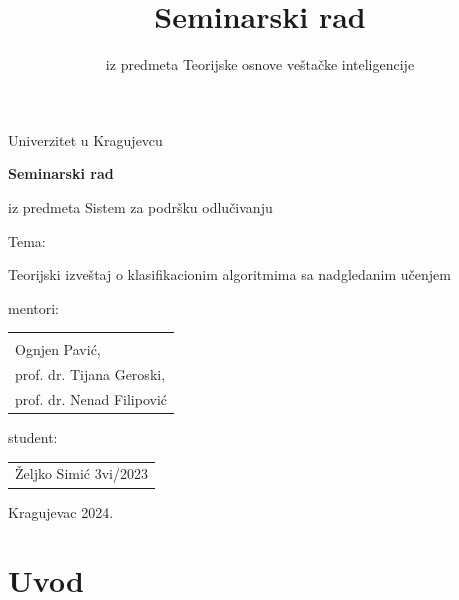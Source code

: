 \documentclass[fontsize=12bp, paper=a4]{scrarticle}
\title{Seminarski rad}
\subtitle{iz predmeta Teorijske osnove veštačke inteligencije}
\begin{document}
\begin{titlepage}
    
    \begin{center}
        
        \vspace*{8cm}
        
        \large{Univerzitet u Kragujevcu}
        
        \vspace*{1cm}

        {\bfseries \LARGE Seminarski rad}
        
        \large{iz predmeta Sistem za podršku odlučivanju}
        
        \vspace*{1cm}
        \large{Tema:}

        \Large{Teorijski izveštaj o klasifikacionim algoritmima sa nadgledanim učenjem}


        \vspace*{2cm}
    \end{center}
    \hfill{\parbox[s]{8cm}{

    mentori: 
    \begin{tabular}{l}
        \\
        \\
        Ognjen Pavić, \\
        prof. dr. Tijana Geroski, \\
        prof. dr. Nenad Filipović 
    \end{tabular}
    
    student: \begin{tabular}{l}
        Željko Simić 3vi/2023
    \end{tabular}
    }}

    \hspace*{\fill} 

    \vspace*{2cm}

    \begin{center}
        Kragujevac 2024.
    \end{center}
\end{titlepage}


\setcounter{page}{1}
\justifying
\linespread{1}
\cfoot[\pagemark]{\pagemark}
\ofoot[]{}
\chead[]{}
%
\justify

\section{Uvod}
\end{document}
